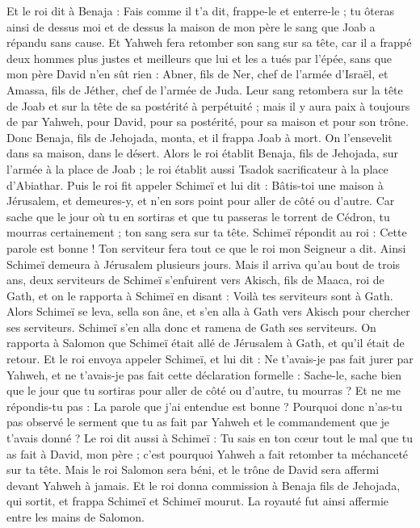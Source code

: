 \begin{multicols}{2}
Et le roi dit à Benaja : Fais comme il t'a dit, frappe-le et enterre-le ; tu ôteras ainsi de dessus moi et de dessus la maison de mon père le sang que Joab a répandu sans cause.
Et Yahweh fera retomber son sang sur sa tête, car il a frappé deux hommes plus justes et meilleurs que lui et les a tués par l'épée, sans que mon père David n’en sût rien : Abner, fils de Ner, chef de l'armée d'Israël, et Amassa, fils de Jéther, chef de l'armée de Juda.
Leur sang retombera sur la tête de Joab et sur la tête de sa postérité à perpétuité ; mais il y aura paix à toujours de par Yahweh, pour David, pour sa postérité, pour sa maison et pour son trône.
Donc Benaja, fils de Jehojada, monta, et il frappa Joab à mort. On l'ensevelit dans sa maison, dans le désert.
Alors le roi établit Benaja, fils de Jehojada, sur l'armée à la place de Joab ; le roi établit aussi Tsadok sacrificateur à la place d'Abiathar.
Puis le roi fit appeler Schimeï et lui dit : Bâtis-toi une maison à Jérusalem, et demeures-y, et n'en sors point pour aller de côté ou d'autre.
Car sache que le jour où tu en sortiras et que tu passeras le torrent de Cédron, tu mourras certainement ; ton sang sera sur ta tête.
Schimeï répondit au roi : Cette parole est bonne ! Ton serviteur fera tout ce que le roi mon Seigneur a dit. Ainsi Schimeï demeura à Jérusalem plusieurs jours.
Mais il arriva qu'au bout de trois ans, deux serviteurs de Schimeï s'enfuirent vers Akisch, fils de Maaca, roi de Gath, et on le rapporta à Schimeï en disant : Voilà tes serviteurs sont à Gath.
Alors Schimeï se leva, sella son âne, et s'en alla à Gath vers Akisch pour chercher ses serviteurs. Schimeï s'en alla donc et ramena de Gath ses serviteurs.
On rapporta à Salomon que Schimeï était allé de Jérusalem à Gath, et qu'il était de retour.
Et le roi envoya appeler Schimeï, et lui dit : Ne t'avais-je pas fait jurer par Yahweh, et ne t'avais-je pas fait cette déclaration formelle : Sache-le, sache bien que le jour que tu sortiras pour aller de côté ou d’autre, tu mourras ? Et ne me répondis-tu pas : La parole que j'ai entendue est bonne ?
Pourquoi donc n'as-tu pas observé le serment que tu as fait par Yahweh et le commandement que je t'avais donné ?
Le roi dit aussi à Schimeï : Tu sais en ton cœur tout le mal que tu as fait à David, mon père ; c'est pourquoi Yahweh a fait retomber ta méchanceté sur ta tête.
Mais le roi Salomon sera béni, et le trône de David sera affermi devant Yahweh à jamais.
Et le roi donna commission à Benaja fils de Jehojada, qui sortit, et frappa Schimeï et Schimeï mourut. La royauté fut ainsi affermie entre les mains de Salomon.

\end{multicols}
